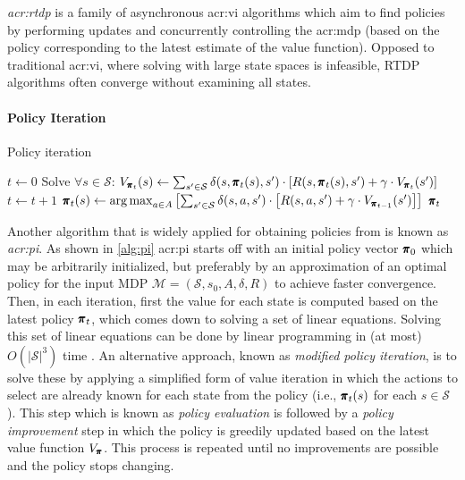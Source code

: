 \textit{\acrfull{acr:rtdp}} \cite{barto1995learning} is a family of asynchronous \acrshort{acr:vi} algorithms which aim to find policies by performing updates and concurrently controlling the \acrshort{acr:mdp} (based on the policy corresponding to the latest estimate of the value function).
Opposed to traditional \acrshort{acr:vi}, where solving  with large state spaces is infeasible, RTDP algorithms often converge without examining all states.


\paragraph{Policy Iteration}
\label{sec:policy-iteration}

\begin{algorithm}[!t]
	\caption{Policy iteration}
	\label{alg:pi}
	\begin{algorithmic}[1]
		\State $t \gets 0$
		\Repeat
		\State Solve $\forall s \in \mathcal{S}$: $V_{\pmb{\pi}_{t}}(s) \gets \sum_{s' \in \mathcal{S}} \delta(s, \pmb{\pi}_t(s), s') \cdot \left[R(s, \pmb{\pi}_t(s), s') + \gamma \cdot V_{\pmb{\pi}_{t}}(s')\right]$
		\State $t \gets t + 1$
		\State $\pmb{\pi}_t(s) \gets \operatorname*{arg\,max}_{a \in A} \left[\sum_{s' \in \mathcal{S}} \delta(s, a, s') \cdot \left[R(s, a, s') + \gamma \cdot V_{\pmb{\pi}_{t - 1}}(s')\right]\right]$
		\EndFor
		\State\Return $\pmb{\pi}_t$
	\end{algorithmic}
\end{algorithm}

Another algorithm that is widely applied for obtaining policies from  is known as \textit{\acrfull{acr:pi}}. As shown in \autoref{alg:pi} \acrshort{acr:pi} starts off with an initial policy vector $\pmb{\pi}_0$ which may be arbitrarily initialized, but preferably by an approximation of an optimal policy for the input MDP $\mathcal{M} = (\mathcal{S}, s_0, A, \delta, R)$ to achieve faster convergence.
Then, in each iteration, first the value for each state is computed based on the latest policy $\pmb{\pi}_t$, which comes down to solving a set of linear equations.
Solving this set of linear equations can be done by linear programming in (at most) $O(\lvert\mathcal{S}\rvert^3)$ time \cite{littman1995complexity}. 
An alternative approach, known as \textit{modified policy iteration}, is to solve these by applying a simplified form of value iteration in which the actions to select are already known for each state from the policy (i.e., $\pmb{\pi}_t(s)$ for each $s \in \mathcal{S}$).
This step which is known as \textit{policy evaluation} is followed by a \textit{policy improvement} step in which the policy is greedily updated based on the latest value function $V_{\pmb{\pi}}$.
This process is repeated until no improvements are possible and the policy stops changing.

